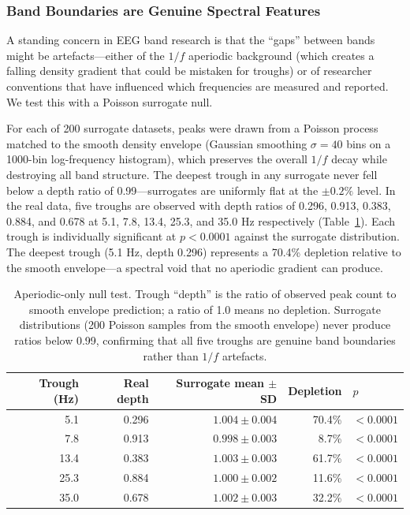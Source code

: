\subsubsection{Band Boundaries are Genuine Spectral Features}
\label{sec:boundaries_genuine}

A standing concern in EEG band research is that the ``gaps'' between bands might be artefacts---either of the $1/f$ aperiodic background (which creates a falling density gradient that could be mistaken for troughs) or of researcher conventions that have influenced which frequencies are measured and reported. We test this with a Poisson surrogate null.

For each of 200 surrogate datasets, peaks were drawn from a Poisson process matched to the smooth density envelope (Gaussian smoothing $\sigma = 40$ bins on a 1000-bin log-frequency histogram), which preserves the overall $1/f$ decay while destroying all band structure. The deepest trough in any surrogate never fell below a depth ratio of 0.99---surrogates are uniformly flat at the $\pm 0.2\%$ level. In the real data, five troughs are observed with depth ratios of 0.296, 0.913, 0.383, 0.884, and 0.678 at 5.1, 7.8, 13.4, 25.3, and 35.0 Hz respectively (Table~\ref{tab:aperiodic_null}). Each trough is individually significant at $p < 0.0001$ against the surrogate distribution. The deepest trough (5.1 Hz, depth 0.296) represents a 70.4\% depletion relative to the smooth envelope---a spectral void that no aperiodic gradient can produce.

\begin{table}[h]
\centering
\caption{Aperiodic-only null test. Trough ``depth'' is the ratio of observed peak count to smooth envelope prediction; a ratio of 1.0 means no depletion. Surrogate distributions (200 Poisson samples from the smooth envelope) never produce ratios below 0.99, confirming that all five troughs are genuine band boundaries rather than $1/f$ artefacts.}
\label{tab:aperiodic_null}
\begin{tabular}{r r r r l}
\toprule
Trough (Hz) & Real depth & Surrogate mean $\pm$ SD & Depletion & $p$ \\
\midrule
5.1  & 0.296 & $1.004 \pm 0.004$ & 70.4\% & $< 0.0001$ \\
7.8  & 0.913 & $0.998 \pm 0.003$ & 8.7\%  & $< 0.0001$ \\
13.4 & 0.383 & $1.003 \pm 0.003$ & 61.7\% & $< 0.0001$ \\
25.3 & 0.884 & $1.000 \pm 0.002$ & 11.6\% & $< 0.0001$ \\
35.0 & 0.678 & $1.002 \pm 0.003$ & 32.2\% & $< 0.0001$ \\
\bottomrule
\end{tabular}
\end{table}

